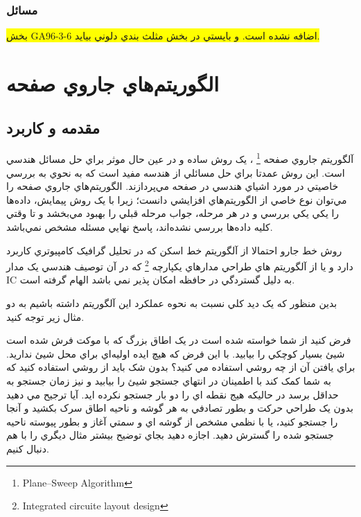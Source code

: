 \documentclass{book}
\begin{document}
\subsection{مسائل}

\colorbox{yellow}{بخش GA96-3-6 اضافه نشده است. و بايستي در بخش مثلث بندي دلوني بيايد.}

\chapter{الگوريتم‌هاي جاروي صفحه}

\section{مقدمه  و کاربرد}

آلگوريتم جاروي صفحه \footnote{Plane–Sweep Algorithm} ، يک روش ساده و در عين حال موثر براي حل مسائل هندسي است. اين روش عمدتا براي حل مسائلي از هندسه مفيد است که به نحوي به بررسي خاصيتي در مورد اشياي هندسي در صفحه مي‌پردازند. الگوريتم‌هاي جاروي صفحه را مي‌توان نوع خاصي از الگوريتم‌هاي افزايشي دانست؛ زيرا با يک روش پيمايش، داده‌ها را يکي يکي بررسي و در هر مرحله، جواب مرحله قبلي را بهبود مي‌بخشد و تا وقتي کليه داده‌ها بررسي نشده‌اند، پاسخ نهايي مسئله مشخص نمي‌باشد.

روش خط جارو احتمالا از آلگوريتم خط اسکن که در تحليل گرافيک کامپيوتري کاربرد دارد و يا از آلگوريتم هاي طراحي مدارهاي يکپارچه \footnote{Integrated circuite layout design} که در آن توصيف هندسي يک مدار IC به دليل گستردگي در حافظه امکان پذير نمي باشد الهام گرفته است.  

بدين منظور که يک ديد کلي نسبت به نحوه عملکرد اين آلگوريتم داشته باشيم به دو مثال زير توجه کنيد.

فرض کنيد از شما خواسته شده است در يک اطاق بزرگ که با موکت فرش شده است شيئ بسيار کوچکي را بيابيد. با اين فرض که هيچ ايده  اوليه‌اي براي محل شيئ نداريد. براي يافتن آن از چه روشي استفاده مي کنيد؟ بدون شک باید از روشي استفاده کنید که به شما کمک کند با اطمينان در انتهاي جستجو شيئ را بيابيد و نيز زمان جستجو به حداقل برسد در حاليکه هيج نقطه اي را دو بار جستجو نکرده ايد. آيا ترجيح مي دهيد بدون يک طراحي حرکت و بطور تصادفي به هر گوشه و ناحيه اطاق سرک بکشيد و آنجا را جستجو کنيد، يا با نظمي مشخص از گوشه اي و سمتي آغاز و بطور پيوسته ناحيه جستجو شده را گسترش دهيد. اجازه دهيد بجاي توضيح بيشتر مثال ديگري را با هم دنبال کنيم.
\end{document}
